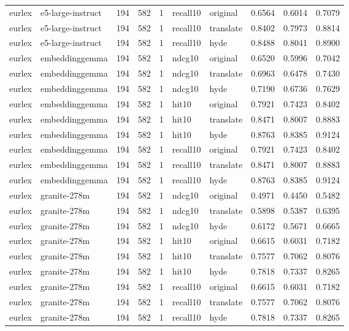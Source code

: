 \begin{tabular}{llrrrllrrr}
eurlex & e5-large-instruct & 194 & 582 & 1 & recall10 & original & 0.6564 & 0.6014 & 0.7079 \\
eurlex & e5-large-instruct & 194 & 582 & 1 & recall10 & translate & 0.8402 & 0.7973 & 0.8814 \\
eurlex & e5-large-instruct & 194 & 582 & 1 & recall10 & hyde & 0.8488 & 0.8041 & 0.8900 \\
eurlex & embeddinggemma & 194 & 582 & 1 & ndcg10 & original & 0.6520 & 0.5996 & 0.7042 \\
eurlex & embeddinggemma & 194 & 582 & 1 & ndcg10 & translate & 0.6963 & 0.6478 & 0.7430 \\
eurlex & embeddinggemma & 194 & 582 & 1 & ndcg10 & hyde & 0.7190 & 0.6736 & 0.7629 \\
eurlex & embeddinggemma & 194 & 582 & 1 & hit10 & original & 0.7921 & 0.7423 & 0.8402 \\
eurlex & embeddinggemma & 194 & 582 & 1 & hit10 & translate & 0.8471 & 0.8007 & 0.8883 \\
eurlex & embeddinggemma & 194 & 582 & 1 & hit10 & hyde & 0.8763 & 0.8385 & 0.9124 \\
eurlex & embeddinggemma & 194 & 582 & 1 & recall10 & original & 0.7921 & 0.7423 & 0.8402 \\
eurlex & embeddinggemma & 194 & 582 & 1 & recall10 & translate & 0.8471 & 0.8007 & 0.8883 \\
eurlex & embeddinggemma & 194 & 582 & 1 & recall10 & hyde & 0.8763 & 0.8385 & 0.9124 \\
eurlex & granite-278m & 194 & 582 & 1 & ndcg10 & original & 0.4971 & 0.4450 & 0.5482 \\
eurlex & granite-278m & 194 & 582 & 1 & ndcg10 & translate & 0.5898 & 0.5387 & 0.6395 \\
eurlex & granite-278m & 194 & 582 & 1 & ndcg10 & hyde & 0.6172 & 0.5671 & 0.6665 \\
eurlex & granite-278m & 194 & 582 & 1 & hit10 & original & 0.6615 & 0.6031 & 0.7182 \\
eurlex & granite-278m & 194 & 582 & 1 & hit10 & translate & 0.7577 & 0.7062 & 0.8076 \\
eurlex & granite-278m & 194 & 582 & 1 & hit10 & hyde & 0.7818 & 0.7337 & 0.8265 \\
eurlex & granite-278m & 194 & 582 & 1 & recall10 & original & 0.6615 & 0.6031 & 0.7182 \\
eurlex & granite-278m & 194 & 582 & 1 & recall10 & translate & 0.7577 & 0.7062 & 0.8076 \\
eurlex & granite-278m & 194 & 582 & 1 & recall10 & hyde & 0.7818 & 0.7337 & 0.8265 \\

\end{tabular}

